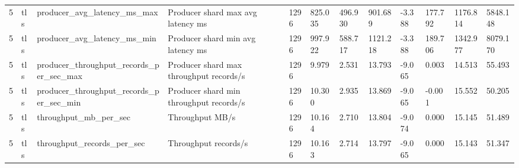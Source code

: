 \begin{longtable}{llllllllllll}
5 & tls & producer\_avg\_latency\_ms\_max & Producer shard max avg latency ms & 1296 & 825.035 & 496.930 & 901.689 & -3.388 & 177.792 & 1176.814 & 5848.148 \\
5 & tls & producer\_avg\_latency\_ms\_min & Producer shard min avg latency ms & 1296 & 997.922 & 588.717 & 1121.218 & -3.388 & 189.706 & 1342.977 & 8079.170 \\
5 & tls & producer\_throughput\_records\_per\_sec\_max & Producer shard max throughput records/s & 1296 & 9.979 & 2.531 & 13.793 & -9.065 & 0.003 & 14.513 & 55.493 \\
5 & tls & producer\_throughput\_records\_per\_sec\_min & Producer shard min throughput records/s & 1296 & 10.300 & 2.935 & 13.869 & -9.065 & -0.001 & 15.552 & 50.205 \\
5 & tls & throughput\_mb\_per\_sec & Throughput MB/s & 1296 & 10.164 & 2.710 & 13.804 & -9.074 & 0.000 & 15.145 & 51.489 \\
5 & tls & throughput\_records\_per\_sec & Throughput records/s & 1296 & 10.163 & 2.714 & 13.797 & -9.065 & 0.000 & 15.143 & 51.347 \\
\hline
\end{longtable}

